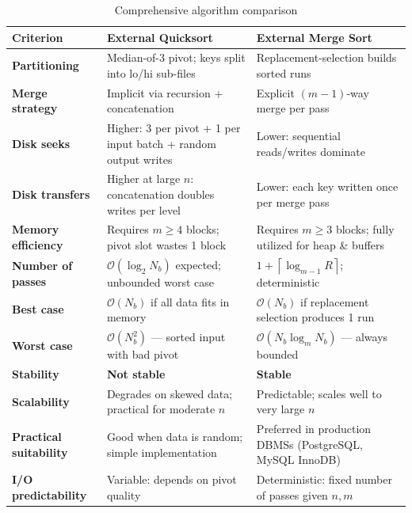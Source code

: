 \documentclass[12pt,a4paper]{article}
\newcommand{\bigO}[1]{\mathcal{O}\!\left(#1\right)}
\newcommand{\ceil}[1]{\left\lceil #1 \right\rceil}
\begin{document}
\begin{table}[H]
\centering
\caption{Comprehensive algorithm comparison}
\label{tab:comparison}
\begin{tabular}{p{3.2cm}p{5.5cm}p{5.5cm}}
\toprule
\textbf{Criterion} & \textbf{External Quicksort} & \textbf{External Merge Sort} \\
\midrule
\textbf{Partitioning} &
  Median-of-3 pivot; keys split into lo/hi sub-files &
  Replacement-selection builds sorted runs \\
\addlinespace
\textbf{Merge strategy} &
  Implicit via recursion + concatenation &
  Explicit $(m-1)$-way merge per pass \\
\addlinespace
\textbf{Disk seeks} &
  Higher: 3 per pivot + 1 per input batch + random output writes &
  Lower: sequential reads/writes dominate \\
\addlinespace
\textbf{Disk transfers} &
  Higher at large $n$: concatenation doubles writes per level &
  Lower: each key written once per merge pass \\
\addlinespace
\textbf{Memory efficiency} &
  Requires $m \ge 4$ blocks; pivot slot wastes 1 block &
  Requires $m \ge 3$ blocks; fully utilized for heap \& buffers \\
\addlinespace
\textbf{Number of passes} &
  $\bigO{\log_2 N_b}$ expected; unbounded worst case &
  $1 + \ceil{\log_{m-1} R}$; deterministic \\
\addlinespace
\textbf{Best case} &
  $\bigO{N_b}$ if all data fits in memory &
  $\bigO{N_b}$ if replacement selection produces 1 run \\
\addlinespace
\textbf{Worst case} &
  $\bigO{N_b^2}$ — sorted input with bad pivot &
  $\bigO{N_b \log_{m} N_b}$ — always bounded \\
\addlinespace
\textbf{Stability} &
  \textcolor{accent}{\textbf{Not stable}} &
  \textcolor{codegreen}{\textbf{Stable}} \\
\addlinespace
\textbf{Scalability} &
  Degrades on skewed data; practical for moderate $n$ &
  Predictable; scales well to very large $n$ \\
\addlinespace
\textbf{Practical suitability} &
  Good when data is random; simple implementation &
  Preferred in production DBMSs (PostgreSQL, MySQL InnoDB) \\
\addlinespace
\textbf{I/O predictability} &
  Variable: depends on pivot quality &
  Deterministic: fixed number of passes given $n, m$ \\
\bottomrule
\end{tabular}
\end{table}
\end{document}
